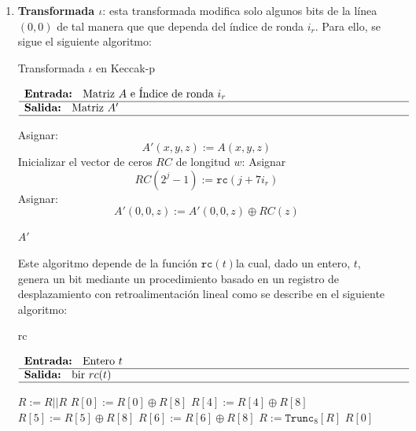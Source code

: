 \begin{enumerate}
	\item \textbf{Transformada \(\iota\)}: esta transformada modifica solo algunos bits de la línea \((0,0)\) de tal manera que que dependa del índice de ronda \(i_r\). Para ello, se sigue el siguiente algoritmo:
	\begin{algorithm}[H]
		\caption{Transformada \(\iota\) en Keccak-p}
		$\begin{array}{p{\textwidth}}
			\textbf{Entrada: } Matriz \(A\) e Índice de ronda \(i_r\) \\ 
			\hline
			\textbf{Salida: } Matriz \(A'\) \\ 
			\hline
		\end{array}$
		\begin{algorithmic}[1]
			\State Asignar:
			\begin{equation}
				A'(x,y,z):=A(x,y,z)
			\end{equation}
			\State Inicializar el vector de ceros \(RC\) de longitud \(w\):
			 
			\State Asignar
			\begin{equation}
				RC(2^j-1):=\texttt{rc}(j+7i_r)
			\end{equation}
			\EndFor
			\State Asignar:
			\begin{equation}
				A'(0,0,z):=A'(0,0,z)\oplus RC(z)
			\end{equation} 
			
			\State \Return \(A'\)
		\end{algorithmic}
	\end{algorithm}
	 
	Este algoritmo depende de la función \(\texttt{rc}(t)\)la cual, dado un entero, $t$, genera un bit mediante un procedimiento basado en un registro de desplazamiento con retroalimentación lineal como se describe en el siguiente algoritmo:
	\begin{algorithm}[H]
		\caption{rc}
		$\begin{array}{p{\textwidth}}
			\textbf{Entrada: } Entero \(t\)\\ 
			\hline
			\textbf{Salida: } bir \(rc(t)\) \\ 
			\hline
		\end{array}$
		\begin{algorithmic}[1]
			\State {}
			\EndIf
			\State \(R:=R||R\)
			\State \(R[0]:=R[0]\oplus R[8]\)
			\State \(R[4]:=R[4]\oplus R[8]\)
			\State \(R[5]:=R[5]\oplus R[8]\)
			\State \(R[6]:=R[6]\oplus R[8]\)
			\State \(R:=\texttt{Trunc}_8[R]\) 
			\EndFor
			\State \Return \(R[0]\)
		\end{algorithmic}
	\end{algorithm}
\end{enumerate}
\newpage

